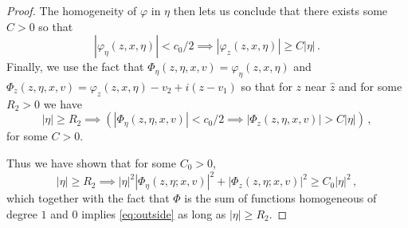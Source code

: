 \documentclass[
	fontsize=11pt, 
	twoside=false, 
	abstract=true, 
	a4paper,
]{scrartcl}
\newcommand{\sem}{\setminus\{0\}}
\newcommand{\RR}{\mathbb{R}}
\newcommand{\CC}{\mathbb{C}}
\newcommand{\norm}[1]{\left\lVert#1\right\rVert}
\newcommand{\abs}[1]{\left\lvert#1\right\rvert}
\newcommand{\del}{\partial}
\newcommand{\td}[1]{\tilde{#1}}
\begin{document}
\begin{proof}
%
	The homogeneity of $\varphi$ in $\eta$ then lets us conclude that there exists some $C>0$ so that %
	\[
		\abs{\varphi_\eta(z,x,\eta)} < c_0/2 \implies \abs{\varphi_z(z,x,\eta)} \geq C\abs{\eta}\,.
	\]
	Finally, we use the fact that $\Phi_\eta(z,\eta,x,v) = \varphi_\eta(z,x,\eta)$ and $\Phi_z(z,\eta,x,v) = \varphi_z(z,x,\eta)-v_2 + i(z-v_1)$ so that for $z$ near $\hat z$ and for some $R_2 > 0$ we have
	\begin{equation*}
		 \abs{\eta} \geq R_2 \implies \left(\abs{\Phi_\eta(z,\eta,x,v)} < c_0/2 \implies \abs{\Phi_z(z,\eta,x,v)} > C\abs{\eta}\right)\,,
	\end{equation*}
	for some $C>0$. 

	Thus we have shown that for some $C_0 > 0$,
	\begin{equation}\label{eq:geqR2}
		\abs{\eta} \geq R_2 \implies \abs{\eta}^2 \abs{\Phi_\eta(z,\eta;x,v)}^2 + \abs{\Phi_z(z,\eta;x,v)}^2 \geq C_0\abs{\eta}^2\,,
	\end{equation}
	which together with the fact that $\Phi$ is the sum of functions homogeneous of degree $1$ and $0$ implies \cref{eq:outside} as long as $\abs{\eta} \geq R_2$. 


\end{proof}
\end{document}
